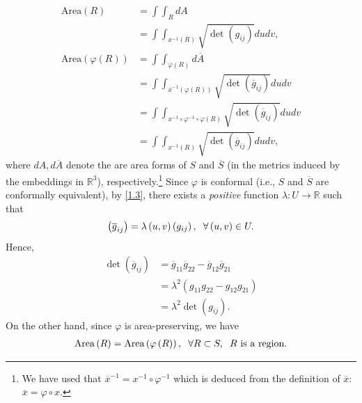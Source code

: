 \documentclass[a4paper]{article}
\numberwithin{equation}{section}
\begin{document}
\begin{align}
\label{3.74}
\mbox{Area}\left( R \right) &= \int {\int_R {dA} } \\
 &= \int {\int_{{x^{ - 1}}\left( R \right)} {\sqrt {\det \left( {{g_{ij}}} \right)} dudv} } ,\\
\mbox{Area}\left( {\varphi \left( R \right)} \right) &= \int {\int_{\varphi \left( R \right)} {d\overline A } } \\
 &= \int {\int_{{{\overline x }^{ - 1}}\left( {\varphi \left( R \right)} \right)} {\sqrt {\det \left( {{{\overline g }_{ij}}} \right)} dudv} } \\
 &= \int {\int_{{x^{ - 1}} \circ {\varphi ^{ - 1}} \circ \varphi \left( R \right)} {\sqrt {\det \left( {{{\overline g }_{ij}}} \right)} dudv} } \\
 &= \int {\int_{{x^{ - 1}}\left( R \right)} {\sqrt {\det \left( {{{\overline g }_{ij}}} \right)} dudv} } , \label{3.79}
\end{align}
where $dA, d\overline{A}$ denote the are area forms of $S$ and $\overline{S}$ (in the metrics induced by the embeddings in $\mathbb{R}^3$), respectively.\footnote{We have used that ${\overline x ^{ - 1}} = {x^{ - 1}} \circ {\varphi ^{ - 1}}$ which is deduced from the definition of $\overline{x}$: $\overline x  = \varphi  \circ x$.} Since $\varphi$ is conformal (i.e., $S$ and $\overline{S}$ are conformally equivalent), by \eqref{1.3}, there exists a \textit{positive} function $\lambda :U\to \mathbb{R}$ such that
\begin{align}
\left( {{{\overline g }_{ij}}} \right) = \lambda \left( {u,v} \right)\left( {{g_{ij}}} \right),\hspace{0.2cm}\forall \left( {u,v} \right) \in U.
\end{align}
Hence, 
\begin{align}
\label{3.81}
\det \left( {{{\overline g }_{ij}}} \right) &= {\overline g _{11}}{\overline g _{22}} - {\overline g _{12}}{\overline g _{21}}\\
& = {\lambda ^2}\left( {{g_{11}}{g_{22}} - {g_{12}}{g_{21}}} \right)\\
 &= {\lambda ^2}\det \left( {{g_{ij}}} \right). \label{3.83}
\end{align}
On the other hand, since $\varphi$ is area-preserving, we have
\begin{align}
\label{3.84}
\mbox{Area}\left( R \right) = \mbox{Area}\left( {\varphi \left( R \right)} \right),\hspace{0.2cm}\forall R \subset S,\hspace{0.2cm} R \mbox{ is a region} .
\end{align}
\end{document}
